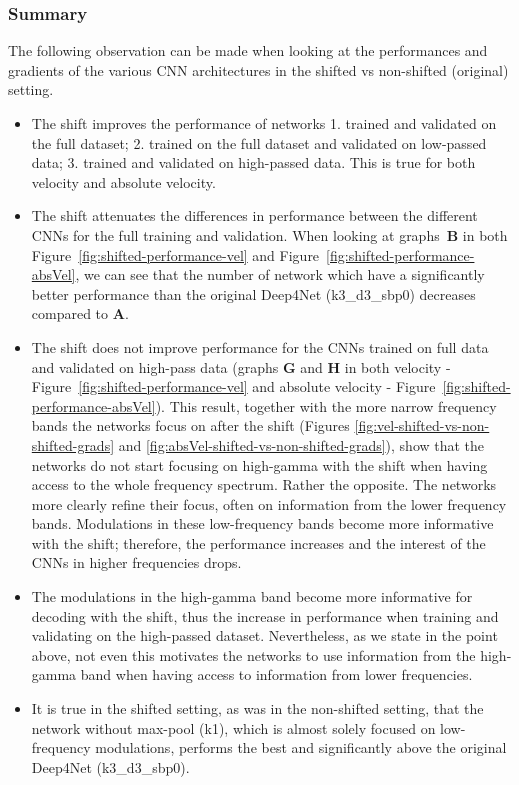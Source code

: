 \subsubsection{Summary}\label{subsubsec:centre-shiftig-summary}
The following observation can be made when looking at the performances and gradients of the various CNN architectures in the shifted vs non-shifted (original) setting.
\begin{itemize}
    \item The shift improves the performance of networks 1. trained and validated on the full dataset; 2. trained on the full dataset and validated on low-passed data;
    3. trained and validated on high-passed data. This is true for both velocity and absolute velocity.
    
    \item The shift attenuates the differences in performance between the different CNNs for the full training and validation.
    When looking at graphs~\textbf{B} in both Figure~\ref{fig:shifted-performance-vel} and Figure~\ref{fig:shifted-performance-absVel}, we can see that the number of network which have a significantly better performance than the original Deep4Net (k3\_d3\_sbp0) decreases compared to \textbf{A}.
    
    \item The shift does not improve performance for the CNNs trained on full data and validated on high-pass data (graphs \textbf{G} and \textbf{H} in both velocity - Figure~\ref{fig:shifted-performance-vel} and absolute velocity - Figure~\ref{fig:shifted-performance-absVel}).
    This result, together with the more narrow frequency bands the networks focus on after the shift (Figures \ref{fig:vel-shifted-vs-non-shifted-grads} and \ref{fig:absVel-shifted-vs-non-shifted-grads}), show that the networks do not start focusing on high-gamma with the shift when having access to the whole frequency spectrum.
    Rather the opposite.
    The networks more clearly refine their focus, often on information from the lower frequency bands.
    Modulations in these low-frequency bands become more informative with the shift; therefore, the performance increases and the interest of the CNNs in higher frequencies drops.
    
    \item The modulations in the high-gamma band become more informative for decoding with the shift, thus the increase in performance when training and validating on the high-passed dataset.
    Nevertheless, as we state in the point above, not even this motivates the networks to use information from the high-gamma band when having access to information from lower frequencies.
    
    \item It is true in the shifted setting, as was in the non-shifted setting, that the network without max-pool (k1), which is almost solely focused on low-frequency modulations, performs the best and significantly above the original Deep4Net (k3\_d3\_sbp0).
    
   
\end{itemize}

